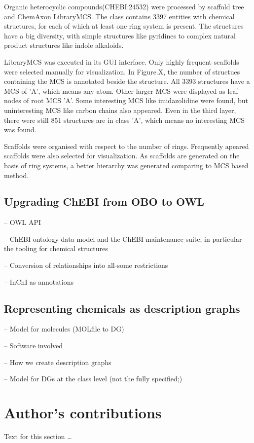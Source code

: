 \documentclass[10pt]{bmc_article}
\newenvironment{bmcformat}{\baselineskip20pt\sloppy\setboolean{publ}{false}}{\baselineskip20pt\sloppy}
\begin{document}
\begin{bmcformat}
Organic heterocyclic compounds(CHEBI:24532) were processed by scaffold tree and ChemAxon LibraryMCS. The class contains 3397 entities with chemical structures, for each of which at least one ring system is present. The structures have a big diversity, with simple structures like pyridines to complex natural product structures like indole alkaloids. 

LibraryMCS was executed in its GUI interface. Only highly frequent scaffolds were selected manually for visualization. In Figure.X, the number of structues containing the MCS is annotated beside the structure. All 3393 structures have a MCS of 'A', which means any atom. Other larger MCS were displayed as leaf nodes of root MCS 'A'. Some interesting MCS like imidazolidine were found, but uninteresting MCS like carbon chains also appeared. Even in the third layer, there were still 851 structures are in class 'A', which means no interesting MCS was found.

Scaffolds were organised with respect to the number of rings. Frequently apeared scaffolds were also selected for visualization. As scaffolds are generated on the basis of ring systems, a better hierarchy was generated comparing to MCS based method.

\subsection*{Upgrading ChEBI from OBO to OWL}

-- OWL API

-- ChEBI ontology data model and the ChEBI maintenance suite, in particular the tooling for chemical structures

-- Conversion of relationships into all-some restrictions

-- InChI as annotations

\subsection*{Representing chemicals as description graphs}
-- Model for molecules (MOLfile to DG)

-- Software involved

-- How we create description graphs

-- Model for DGs at the class level (not the fully specified;)



\bigskip


\section*{Author's contributions}
    Text for this section \ldots


\end{bmcformat}
\end{document}
